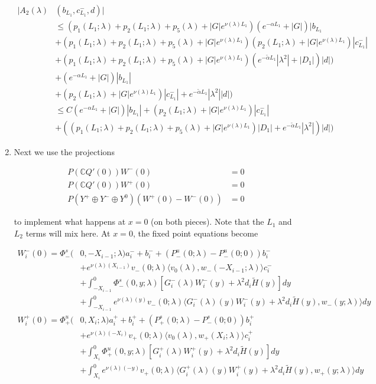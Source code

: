 \documentclass[12pt]{article}
\def\C{{\mathbb C}}
\begin{document}
\begin{enumerate}
\begin{align*}
|A_2(\lambda)&(b_{L_1}, c_{L_1}^-, d)| \\
&\leq ( p_1(L_1; \lambda) + p_2(L_1; \lambda) + p_5(\lambda) + |G|e^{\nu(\lambda)L_1})( e^{-\alpha L_1} + |G|)|b_{L_1}  \\
&+ ( p_1(L_1; \lambda) + p_2(L_1; \lambda) + p_5(\lambda) + |G|e^{\nu(\lambda)L_1})( p_2(L_1; \lambda) + |G|e^{\nu(\lambda) L_1})|c_{L_1}^-| \\
&+ ( p_1(L_1; \lambda) + p_2(L_1; \lambda) + p_5(\lambda) + |G|e^{\nu(\lambda)L_1})(e^{-\tilde{\alpha}L_1}|\lambda^2| + |D_1|)|d|) \\  
&+ ( e^{-\alpha L_1} + |G|)|b_{L_1}| \\
&+ ( p_2(L_1; \lambda) + |G|e^{\nu(\lambda)L_1})|c_{L_1}^-|+ e^{-\tilde{\alpha} L_1} |\lambda^2||d| ) \\
&\leq C( e^{-\alpha L_1} + |G|)|b_{L_1}| + ( p_2(L_1; \lambda) + |G|e^{\nu(\lambda)L_1})|c_{L_1}^-| \\
&+ (( p_1(L_1; \lambda) + p_2(L_1; \lambda) + p_5(\lambda) + |G|e^{\nu(\lambda)L_1})|D_1| + e^{-\tilde{\alpha}L_1}|\lambda^2|)|d| ) 
\end{align*}


\item Next we use the projections 

\begin{align*}
P(\C Q'(0))W^-(0) &= 0 \\
P(\C Q'(0))W^+(0) &= 0 \\
P(Y^+ \oplus Y^- \oplus Y^0) ( W^+(0) - W^-(0) ) &= 0
\end{align*}

to implement what happens at $x = 0$ (on both pieces). Note that the $L_1$ and $L_2$ terms will mix here. At $x = 0$, the fixed point equations become

\begin{align*}
W_i^-(0) = \Phi^s_-(&0, -X_{i-1}; \lambda)a_i^- + b_i^- + (P^u_-(0; \lambda) - P^u_-(0; 0))b_i^- \\
&+ e^{\nu(\lambda)(X_{i-1})} v_-(0; \lambda) \langle v_0(\lambda), w_-(-X_{i-1}; \lambda) \rangle c_i^- \\
&+ \int_{-X_{i-1}}^0 \Phi^s_-(0, y; \lambda) [ G_i^-(\lambda)W_i^-(y) + \lambda^2 d_i \tilde{H}(y) ] dy \\
&+ \int_{-X_{i-1}}^0
e^{\nu(\lambda)(y)} v_-(0; \lambda) \langle G_i^-(\lambda)(y)W_i^-(y) + \lambda^2 d_i \tilde{H}(y), w_-(y; \lambda) \rangle dy \\
W_i^+(0) = \Phi^u_+(&0, X_i; \lambda)a_i^+ + b_i^+ + (P^s_+(0; \lambda) - P^s_-(0; 0))b_i^+ \\
&+ e^{\nu(\lambda)(-X_i)} v_+(0; \lambda) \langle v_0(\lambda), w_+(X_i; \lambda) \rangle c_i^+ \\
&+ \int_{X_i}^0 \Phi^u_+(0, y; \lambda) [ G_i^+(\lambda)W_i^+(y) + \lambda^2 d_i \tilde{H}(y) ] dy \\
&+ \int_{X_i}^0 e^{\nu(\lambda)(-y)} v_+(0; \lambda) \langle G_i^+(\lambda)(y)W_i^+(y) + \lambda^2 d_i \tilde{H}(y), w_+(y; \lambda) \rangle dy
\end{align*}


\end{enumerate}
\end{document}
